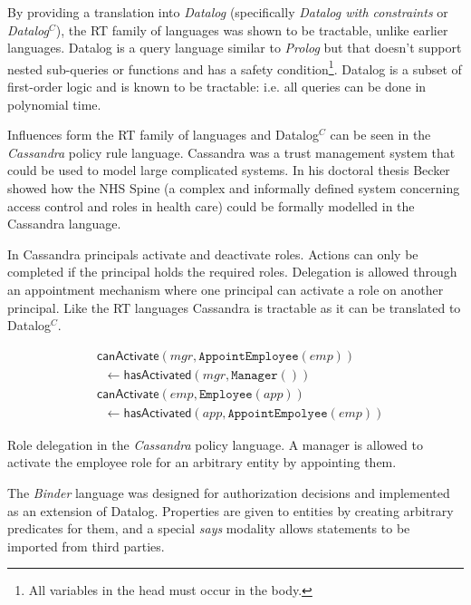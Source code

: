 \documentclass[report.tex]{subfiles}
\begin{document}
By providing a translation into \emph{Datalog} (specifically \emph{Datalog with
  constraints} or \emph{Datalog$^C$\cite{Li:2003ix}}), the RT family of
languages was shown to be tractable, unlike earlier languages.  Datalog is a
query language similar to \emph{Prolog} but that doesn't support nested
sub-queries or functions and has a safety condition\footnote{All variables in
  the head must occur in the body.}.  Datalog is a subset of first-order logic
and is known to be tractable: i{.}e{.} all queries can be done in polynomial
time.

Influences form the RT family of languages and Datalog$^C$ can be seen in the
\emph{Cassandra} policy rule language\cite{Becker:2004fi}.  Cassandra was a
trust management system that could be used to model large complicated systems.
In his doctoral thesis Becker showed how the NHS Spine (a complex and informally
defined system concerning access control and roles in health care) could be
formally modelled in the Cassandra language.  

In Cassandra principals activate and deactivate roles. Actions can only be completed if the
principal holds the required roles.  Delegation is allowed through an
appointment mechanism where one principal can activate a role on another
principal.  Like the RT languages Cassandra is tractable as it can be translated
to Datalog$^C$.

\begin{marginfigure}\label{code:cassandra}
  \begin{align*}
    &\textsf{canActivate}(mgr, \texttt{AppointEmployee}(emp)) \\ 
    &\;\;\gets \textsf{hasActivated}(mgr, \texttt{Manager}()) \\
    &\textsf{canActivate}(emp, \texttt{Employee}(app)) \\
    &\;\;\gets \textsf{hasActivated}(app, \texttt{AppointEmpolyee}(emp))
  \end{align*}
  \caption{Role delegation in the \emph{Cassandra} policy language. A manager is
  allowed to activate the employee role for an arbitrary entity by appointing
  them.}
\end{marginfigure}

The \emph{Binder} language\cite{DeTreville:2002ff} was designed for authorization
decisions\cite{Abadi:2003kt} and implemented as an extension of Datalog.
Properties are given to entities by creating arbitrary predicates for them, and
a special \emph{says} modality allows statements to be imported from third
parties.
\end{document}

